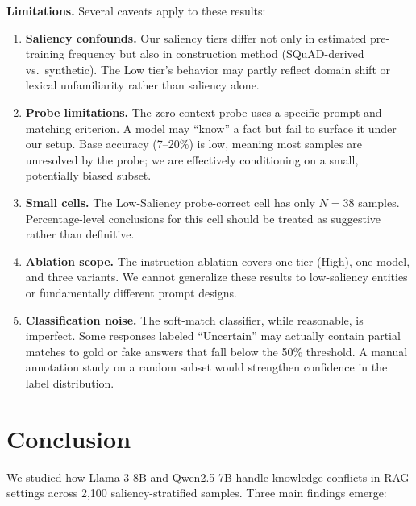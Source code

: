 \documentclass[11pt, letterpaper]{article}
\begin{document}
\textbf{Limitations.} Several caveats apply to these results:

\begin{enumerate}[nosep]
    \item \textbf{Saliency confounds.} Our saliency tiers differ not only in estimated pre-training frequency but also in construction method (SQuAD-derived vs.\ synthetic). The Low tier's behavior may partly reflect domain shift or lexical unfamiliarity rather than saliency alone.
    \item \textbf{Probe limitations.} The zero-context probe uses a specific prompt and matching criterion. A model may ``know'' a fact but fail to surface it under our setup. Base accuracy (7--20\%) is low, meaning most samples are unresolved by the probe; we are effectively conditioning on a small, potentially biased subset.
    \item \textbf{Small cells.} The Low-Saliency probe-correct cell has only $N=38$ samples. Percentage-level conclusions for this cell should be treated as suggestive rather than definitive.
    \item \textbf{Ablation scope.} The instruction ablation covers one tier (High), one model, and three variants. We cannot generalize these results to low-saliency entities or fundamentally different prompt designs.
    \item \textbf{Classification noise.} The soft-match classifier, while reasonable, is imperfect. Some responses labeled ``Uncertain'' may actually contain partial matches to gold or fake answers that fall below the 50\% threshold. A manual annotation study on a random subset would strengthen confidence in the label distribution.
\end{enumerate}

\section*{Conclusion}

We studied how Llama-3-8B and Qwen2.5-7B handle knowledge conflicts in RAG settings across 2,100 saliency-stratified samples. Three main findings emerge:
\end{document}
